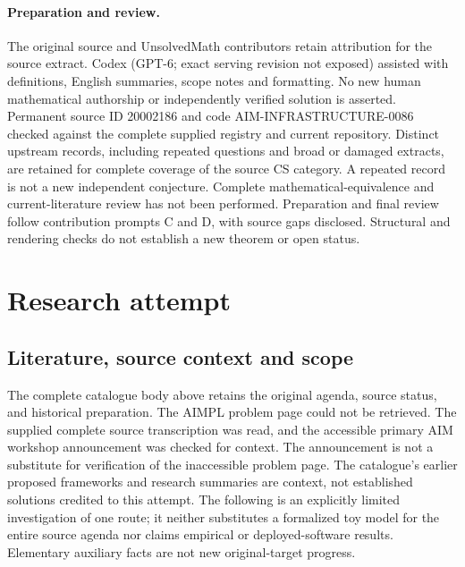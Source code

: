 \documentclass[11pt]{article}
\begin{document}
\paragraph{Preparation and review.}
The original source and UnsolvedMath contributors retain attribution for the source extract. Codex (GPT-6; exact serving revision not exposed) assisted with definitions, English summaries, scope notes and formatting. No new human mathematical authorship or independently verified solution is asserted. Permanent source ID 20002186 and code AIM-INFRASTRUCTURE-0086 checked against the complete supplied registry and current repository. Distinct upstream records, including repeated questions and broad or damaged extracts, are retained for complete coverage of the source CS category. A repeated record is not a new independent conjecture. Complete mathematical-equivalence and current-literature review has not been performed. Preparation and final review follow contribution prompts C and D, with source gaps disclosed. Structural and rendering checks do not establish a new theorem or open status.
\label{end:20002186}

\section{Research attempt}
\subsection{Literature, source context and scope}
The complete catalogue body above retains the original agenda, source status, and historical preparation. The AIMPL problem page could not be retrieved. The supplied complete source transcription was read, and the accessible primary AIM workshop announcement was checked for context. The announcement is not a substitute for verification of the inaccessible problem page. The catalogue's earlier proposed frameworks and research summaries are context, not established solutions credited to this attempt. The following is an explicitly limited investigation of one route; it neither substitutes a formalized toy model for the entire source agenda nor claims empirical or deployed-software results. Elementary auxiliary facts are not new original-target progress.
\end{document}
